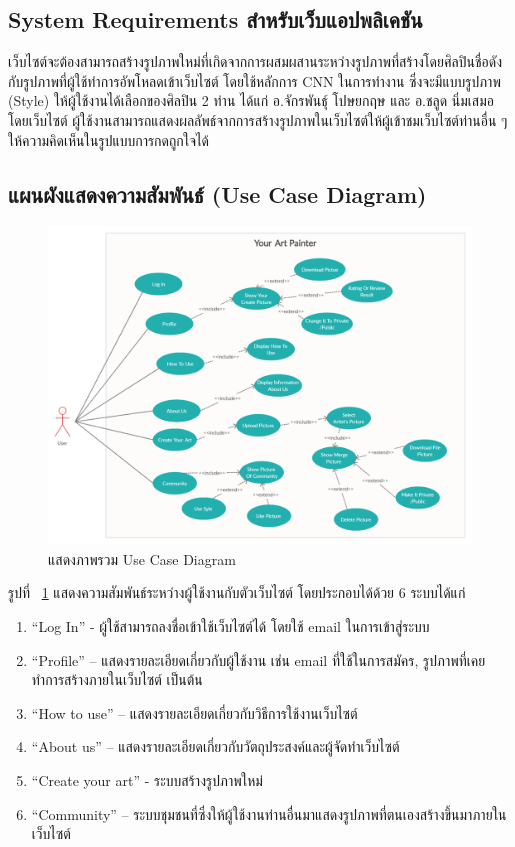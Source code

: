 \documentclass[12pt,oneside,openright,a4paper]{cpe-thai-project}
\begin{document}
\subsection{System Requirements สำหรับเว็บแอปพลิเคชัน}
\par\setlength{\parindent}{5ex}
เว็บไซต์จะต้องสามารถสร้างรูปภาพใหม่ที่เกิดจากการผสมผสานระหว่างรูปภาพที่สร้างโดยศิลปินชื่อดังกับรูปภาพที่ผู้ใช้ทำการอัพโหลดเข้าเว็บไซต์ โดยใช้หลักการ CNN ในการทำงาน ซึ่งจะมีแบบรูปภาพ (Style) ให้ผู้ใช้งานได้เลือกของศิลปิน 2 ท่าน ได้แก่ อ.จักรพันธุ์ โปษยกฤษ และ อ.ชลูด นิ่มเสมอ โดยเว็บไซต์ ผู้ใช้งานสามารถแสดงผลลัพธ์จากการสร้างรูปภาพในเว็บไซต์ให้ผู้เข้าชมเว็บไซต์ท่านอื่น ๆให้ความคิดเห็นในรูปแบบการกดถูกใจได้ 

\newpage
\subsection{แผนผังแสดงความสัมพันธ์ (Use Case Diagram)}

\begin{figure}[!h]
  \centering
  \includegraphics[width=15cm]{./image/use-case.png}
  \caption{แสดงภาพรวม Use Case Diagram}
  \label{fig:usecase}
\end{figure}

รูปที่ ~\ref{fig:usecase} แสดงความสัมพันธ์ระหว่างผู้ใช้งานกับตัวเว็บไซต์ โดยประกอบได้ด้วย 6 ระบบได้แก่


\begin{enumerate}
  \item “Log In” - ผู้ใช้สามารถลงชื่อเข้าใช้เว็บไซต์ได้ โดยใช้ email ในการเข้าสู่ระบบ
  \item “Profile” – แสดงรายละเอียดเกี่ยวกับผู้ใช้งาน เช่น email ที่ใช้ในการสมัคร, รูปภาพที่เคยทำการสร้างภายในเว็บไซต์ เป็นต้น
  \item “How to use” – แสดงรายละเอียดเกี่ยวกับวิธีการใช้งานเว็บไซต์
  \item “About us” – แสดงรายละเอียดเกี่ยวกับวัตถุประสงค์และผู้จัดทำเว็บไซต์ 
  \item “Create your art” - ระบบสร้างรูปภาพใหม่
  \item “Community” – ระบบชุมชนที่ซึ่งให้ผู้ใช้งานท่านอื่นมาแสดงรูปภาพที่ตนเองสร้างขึ้นมาภายในเว็บไซต์
\end{enumerate}
\end{document}
